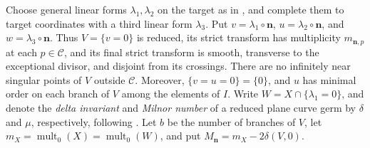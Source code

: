 \documentclass[11pt,letterpaper]{article}
\numberwithin{equation}{section}
\theoremstyle{remark}
\theoremstyle{plain}
\newcommand{\mult}{\operatorname{mult}}
\begin{document}
Choose general linear forms $\lambda_1,\lambda_2$ on the target as in
\cite[Sections~2.1--2.2]{PortillaReduction}, and complete them to target
coordinates with a third linear form $\lambda_3$.  Put
$v=\lambda_1\circ\boldsymbol n$, $u=\lambda_2\circ\boldsymbol n$,
and $w=\lambda_3\circ\boldsymbol n$.
Thus $V=\{v=0\}$
is reduced, its strict transform has multiplicity
$m_{\boldsymbol n,p}$ at each $p\in\mathcal C$, and its final
strict transform is smooth, transverse to the exceptional divisor,
and disjoint from its crossings.  There are no infinitely near
singular points of $V$ outside $\mathcal C$.  Moreover,
$\{v=u=0\}=\{0\}$, and $u$ has minimal order on each branch
of $V$ among the elements of $I$.
Write $W=X\cap\{\lambda_1=0\}$, and denote the \emph{delta invariant}
and \emph{Milnor number} of a reduced plane curve germ by $\delta$ and
$\mu$, respectively, following
\cite[p.~206 and Definition~I.2.1]{GreuelLossenShustin}.
Let $b$ be the number of branches of $V$, let
$m_X=\mult_0(X)=\mult_0(W)$, and put
$M_{\boldsymbol n}=m_X-2\delta(V,0)$.
\end{document}
